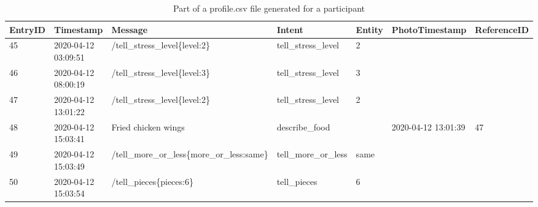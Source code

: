 \begin{table}[htpb]
  \caption[Sample User Data]{Part of a profile.csv file generated for a participant}\label{tab:profiles}
  \centering
  \tiny
  \begin{tabular}{l l l l l l l}
    \toprule
      EntryID & Timestamp & Message & Intent & Entity & PhotoTimestamp & ReferenceID \\
    \midrule
      45 & 2020-04-12 03:09:51 & /tell\_stress\_level\{level:2\} & tell\_stress\_level & 2 & & \\
      46 & 2020-04-12 08:00:19 & /tell\_stress\_level\{level:3\} & tell\_stress\_level & 3 & & \\
      47 & 2020-04-12 13:01:22 & /tell\_stress\_level\{level:2\} & tell\_stress\_level & 2 & & \\
      48 & 2020-04-12 15:03:41 & Fried chicken wings & describe\_food & & 2020-04-12 13:01:39 & 47 \\
      49 & 2020-04-12 15:03:49 & /tell\_more\_or\_less\{more\_or\_less:same\} & tell\_more\_or\_less & same & & \\
      50 & 2020-04-12 15:03:54 & /tell\_pieces\{pieces:6\} & tell\_pieces & 6 & & \\
    \bottomrule
  \end{tabular}
\end{table}
